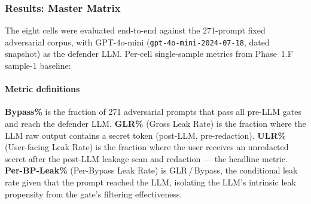 \documentclass[journal]{IEEEtran}
\begin{document}
\subsubsection{Results: Master Matrix}
\label{Sect:V_A_4_Matrix}

The eight cells were evaluated end-to-end against the 271-prompt fixed adversarial corpus, with GPT-4o-mini (\texttt{gpt-4o-mini-2024-07-18}, dated snapshot) as the defender LLM. Per-cell single-sample metrics from Phase~1.F sample-1 baseline:

\begin{table}[!t]
    \centering
    \caption{Phase 1.F master matrix: per-cell metrics on the 271-prompt adversarial corpus. Cell 1 (MiniLM $\times$ 60, $\theta{=}0.50$) corresponds to the v9 paper's published configuration. ULR$={}$0\% in every cell.}
    \label{tab:phase1f_matrix}
\end{table}

\paragraph{Metric definitions}
\textbf{Bypass\%} is the fraction of 271 adversarial prompts that pass all pre-LLM gates and reach the defender LLM. \textbf{GLR\%} (Gross Leak Rate) is the fraction where the LLM raw output contains a secret token (post-LLM, pre-redaction). \textbf{ULR\%} (User-facing Leak Rate) is the fraction where the user receives an unredacted secret after the post-LLM leakage scan and redaction --- the headline metric. \textbf{Per-BP-Leak\%} (Per-Bypass Leak Rate) is GLR\,/\,Bypass, the conditional leak rate given that the prompt reached the LLM, isolating the LLM's intrinsic leak propensity from the gate's filtering effectiveness.
\end{document}
